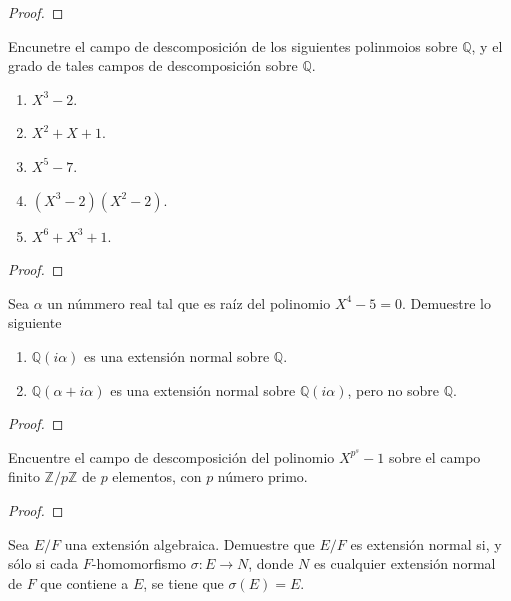 \documentclass[12pt]{report}
\theoremstyle{largebreak}
\begin{document}
\begin{proof}
    
\end{proof}

\begin{excer}
    Encunetre el campo de descomposición de los siguientes polinmoios sobre $\mathbb{Q}$, y el grado de tales campos de descomposición sobre $\mathbb{Q}$.
    \begin{enumerate}
        \item $X^3-2$.
        \item $X^2+X+1$.
        \item $X^5-7$.
        \item $(X^3-2)(X^2-2)$.
        \item $X^6+X^3+1$.
    \end{enumerate}
\end{excer}

\begin{proof}
    
\end{proof}

\begin{excer}
    Sea $\alpha$ un númmero real tal que es raíz del polinomio $X^4-5=0$. Demuestre lo siguiente
    \begin{enumerate}
        \item $\mathbb{Q}(i\alpha)$ es una extensión normal sobre $\mathbb{Q}$.
        \item $\mathbb{Q}(\alpha+i\alpha)$ es una extensión normal sobre $\mathbb{Q}(i\alpha)$, pero no sobre $\mathbb{Q}$.
    \end{enumerate}
\end{excer}

\begin{proof}
    
\end{proof}

\begin{excer}
    Encuentre el campo de descomposición del polinomio $X^{p^s}-1$ sobre el campo finito $\mathbb{Z}/p\mathbb{Z}$ de $p$ elementos, con $p$ número primo.
\end{excer}

\begin{proof}
    
\end{proof}

\begin{excer}
    Sea $E/F$ una extensión algebraica. Demuestre que $E/F$ es extensión normal si, y sólo si cada $F$-homomorfismo $\sigma:E\rightarrow N$, donde $N$ es cualquier extensión normal de $F$ que contiene a $E$, se tiene que $\sigma(E)=E$.
\end{excer}
\end{document}
